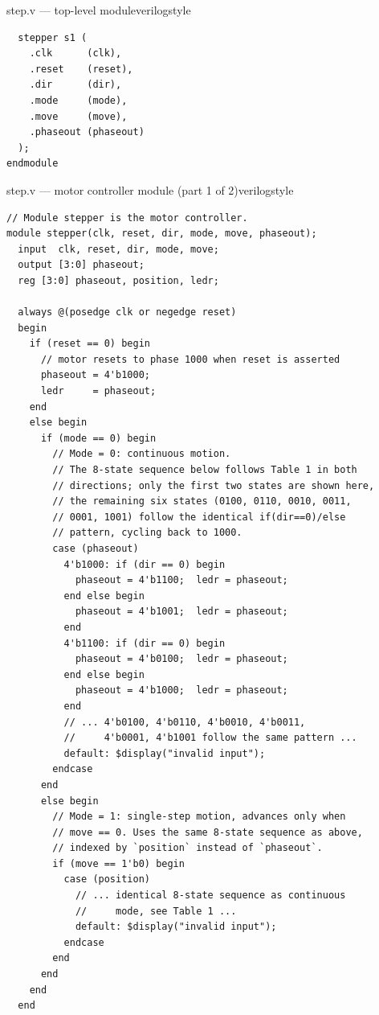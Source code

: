 \begin{procedure}
\begin{codepanel}{step.v --- top-level module}{verilogstyle}
\begin{lstlisting}
  stepper s1 (
    .clk      (clk),
    .reset    (reset),
    .dir      (dir),
    .mode     (mode),
    .move     (move),
    .phaseout (phaseout)
  );
endmodule
\end{lstlisting}
  \end{codepanel}

  \begin{codepanel}{step.v --- motor controller module (part 1 of 2)}{verilogstyle}
    \begin{lstlisting}
// Module stepper is the motor controller.
module stepper(clk, reset, dir, mode, move, phaseout);
  input  clk, reset, dir, mode, move;
  output [3:0] phaseout;
  reg [3:0] phaseout, position, ledr;

  always @(posedge clk or negedge reset)
  begin
    if (reset == 0) begin
      // motor resets to phase 1000 when reset is asserted
      phaseout = 4'b1000;
      ledr     = phaseout;
    end
    else begin
      if (mode == 0) begin
        // Mode = 0: continuous motion.
        // The 8-state sequence below follows Table 1 in both
        // directions; only the first two states are shown here,
        // the remaining six states (0100, 0110, 0010, 0011,
        // 0001, 1001) follow the identical if(dir==0)/else
        // pattern, cycling back to 1000.
        case (phaseout)
          4'b1000: if (dir == 0) begin
            phaseout = 4'b1100;  ledr = phaseout;
          end else begin
            phaseout = 4'b1001;  ledr = phaseout;
          end
          4'b1100: if (dir == 0) begin
            phaseout = 4'b0100;  ledr = phaseout;
          end else begin
            phaseout = 4'b1000;  ledr = phaseout;
          end
          // ... 4'b0100, 4'b0110, 4'b0010, 4'b0011,
          //     4'b0001, 4'b1001 follow the same pattern ...
          default: $display("invalid input");
        endcase
      end
      else begin
        // Mode = 1: single-step motion, advances only when
        // move == 0. Uses the same 8-state sequence as above,
        // indexed by `position` instead of `phaseout`.
        if (move == 1'b0) begin
          case (position)
            // ... identical 8-state sequence as continuous
            //     mode, see Table 1 ...
            default: $display("invalid input");
          endcase
        end
      end
    end
  end
\end{lstlisting}
  \end{codepanel}
  \vspace{-4pt}


\end{procedure}
